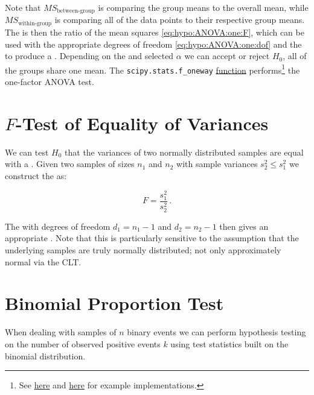 Note that $MS_{\text{between-group}}$ is comparing the group means to the overall mean,
while $MS_{\text{within-group}}$ is comparing all of the data points to their respective group means.
The \Fstat is then the ratio of the mean squares \cref{eq:hypo:ANOVA:one:F},
which can be used with the appropriate degrees of freedom \cref{eq:hypo:ANOVA:one:dof}
and the \Fdist to produce a \pvalue.
Depending on the \pvalue and selected $\alpha$
we can accept or reject $H_{0}$,
\ie all of the groups share one mean.
The \texttt{scipy.stats.f\_oneway} \href{https://docs.scipy.org/doc/scipy/reference/generated/scipy.stats.f_oneway.html#scipy.stats.f_oneway}{function}
performs\footnote{See
\href{https://www.analyticsvidhya.com/blog/2020/06/introduction-anova-statistics-data-science-covid-python/}{here} and
\href{https://www.reneshbedre.com/blog/anova.html}{here}
for example implementations.} the one-factor ANOVA test.

\section{\texorpdfstring{$F$}{F}-Test of Equality of Variances}
\label{hypo:F_test_var}

We can test $H_{0}$ that the variances of two normally distributed samples are equal with a \Ftest.
Given two samples of sizes $n_{1}$ and $n_{2}$ with sample variances $s_{2}^{2} \leq s_{1}^{2}$
we construct the \Fstat as:

\begin{equation}\label{eq:hypo:F_test_var}
F = \frac{s_{1}^{2}}{s_{2}^{2}}\,.
\end{equation}

The \Fdist with degrees of freedom $d_{1} = n_{1}-1$ and $d_{2} = n_{2}-1$
then gives an appropriate \pvalue.
Note that this \Ftest is particularly sensitive to the assumption that
the underlying samples are truly normally distributed;
not only approximately normal via the CLT.

\section{Binomial Proportion Test}
\label{hypo:binomial_test}

When dealing with samples of $n$ binary events we can perform hypothesis testing
on the number of observed positive events $k$
using test statistics built on the binomial distribution.

